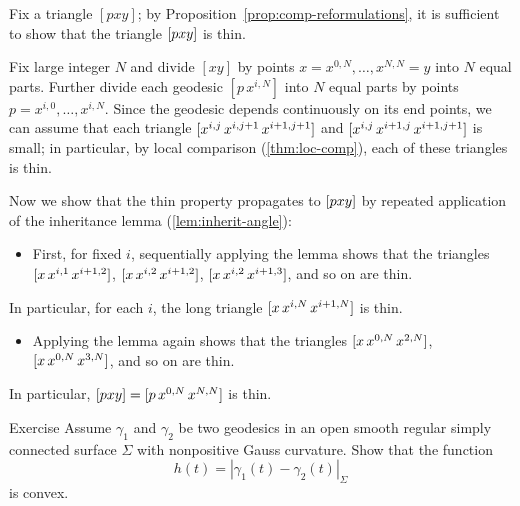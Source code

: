 Fix a triangle $[p x y]$; 
by Proposition~\ref{prop:comp-reformulations}, it is sufficient to show that the triangle $[p{x}{y}]$ is thin.   

Fix large integer $N$ and 
divide $[xy]$ by points $x=x^{0,N},\dots,x^{N,N}=y$ into $N$ equal parts.
Further divide each geodesic $[p\,x^{i,N}]$ into $N$ equal parts by points $p=x^{i,0},\dots,x^{i,N}$.
Since the geodesic depends continuously on its end points, we can assume that each triangle 
 $[x^{i,j}{\,x^{i,j+1}}{\,x^{i+1,j+1}}]$ and $[x^{i,j}{\,x^{i+1,j}}{\,x^{i+1,j+1}}]$ is small;
 in particular, by local comparison (\ref{thm:loc-comp}), each of these triangles is thin. 

Now we show that the thin property propagates to $[p{x}{y}]$ by repeated application of the inheritance lemma (\ref{lem:inherit-angle}):
\begin{itemize}
\item 
First, for fixed $i$, 
sequentially applying the lemma shows  that the triangles 
$[x{\,x^{i,1}}{\,x^{i+1,2}}]$, 
$[x{\,x^{i,2}}{\,x^{i+1,2}}]$, 
$[x{\,x^{i,2}}{\,x^{i+1,3}}]$,
and so on are thin. 
\end{itemize}
In particular, for each $i$, the long triangle $[x{\,x^{i,N}}{\,x^{i+1,N}}]$ is thin.
\begin{itemize} 
\item 
Applying the lemma again shows that the  triangles $[x{\,x^{0,N}}{\,x^{2,N}}]$, $[x{\,x^{0,N}}{\,x^{3,N}}]$, and so on are thin. 
\end{itemize}
In particular, $[p{x}{y}]=[p{\,x^{0,N}}{\,x^{N,N}}]$ is thin.
\qeds


\begin{thm}{Exercise}\label{ex:convex-dist}
Assume $\gamma_1$ and $\gamma_2$ be two geodesics in an open smooth regular simply connected surface $\Sigma$ with nonpositive Gauss curvature.
Show that the function
\[h(t)=|\gamma_1(t)-\gamma_2(t)|_\Sigma\]
is convex.
\end{thm}

